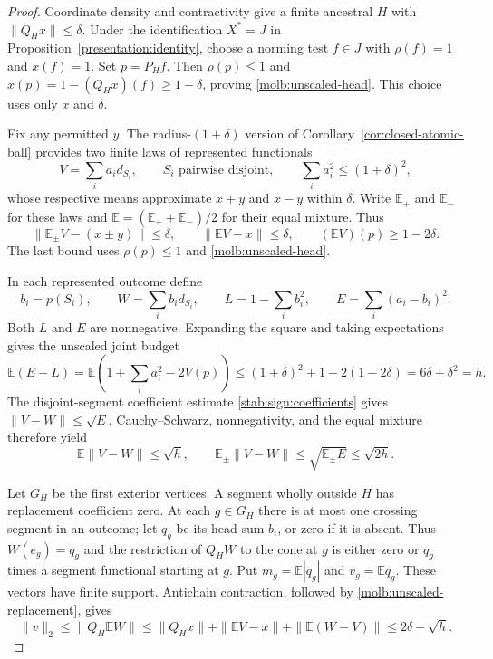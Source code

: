 \begin{proof}
Coordinate density and contractivity give a finite ancestral $H$
with $\|Q_Hx\|\le\delta$. Under the identification $X^*=J$ in
Proposition~\ref{presentation:identity}, choose a norming test
$f\in J$ with $\rho(f)=1$ and $x(f)=1$. Set $p=P_Hf$.
Then $\rho(p)\le1$ and
$x(p)=1-(Q_Hx)(f)\ge1-\delta$, proving
\eqref{molb:unscaled-head}. This choice uses only $x$ and $\delta$.

Fix any permitted $y$. The radius-$(1+\delta)$ version of
Corollary~\ref{cor:closed-atomic-ball} provides two finite laws of
represented functionals
\[
 V=\sum_i a_i d_{S_i},\qquad
 S_i\text{ pairwise disjoint},\qquad
 \sum_i a_i^2\le(1+\delta)^2,
\]
whose respective means approximate $x+y$ and $x-y$ within $\delta$.
Write $\mathbb E_+$ and $\mathbb E_-$ for these laws and
$\mathbb E=(\mathbb E_++\mathbb E_-)/2$ for their equal mixture.
Thus
\[
 \|\mathbb E_\pm V-(x\pm y)\|\le\delta,
 \qquad \|\mathbb EV-x\|\le\delta,
 \qquad (\mathbb EV)(p)\ge1-2\delta.
\]
The last bound uses $\rho(p)\le1$ and
\eqref{molb:unscaled-head}.

In each represented outcome define
\[
 b_i=p(S_i),\qquad W=\sum_i b_i d_{S_i},\qquad
 L=1-\sum_i b_i^2,\qquad E=\sum_i(a_i-b_i)^2.
\]
Both $L$ and $E$ are nonnegative. Expanding the square and taking
expectations gives the unscaled joint budget
\begin{equation}\label{molb:unscaled-budget}
 \mathbb E(E+L)
 =\mathbb E\left(1+\sum_i a_i^2-2V(p)\right)
 \le(1+\delta)^2+1-2(1-2\delta)
 =6\delta+\delta^2=h.
\end{equation}
The disjoint-segment coefficient estimate
\eqref{stab:sign:coefficients} gives $\|V-W\|\le\sqrt E$.
Cauchy--Schwarz, nonnegativity, and the equal mixture therefore yield
\begin{equation}\label{molb:unscaled-replacement}
 \mathbb E\|V-W\|\le\sqrt h,
 \qquad
 \mathbb E_\pm\|V-W\|
 \le\sqrt{\mathbb E_\pm E}\le\sqrt{2h}.
\end{equation}

Let $G_H$ be the first exterior vertices. A segment wholly outside
$H$ has replacement coefficient zero. At each $g\in G_H$ there is
at most one crossing segment in an outcome; let $q_g$ be its head
sum $b_i$, or zero if it is absent. Thus $W(e_g)=q_g$ and the
restriction of $Q_HW$ to the cone at $g$ is either zero or $q_g$
times a segment functional starting at $g$. Put
$m_g=\mathbb E|q_g|$ and $v_g=\mathbb E q_g$.
These vectors have finite support. Antichain contraction, followed
by \eqref{molb:unscaled-replacement}, gives
\begin{equation}\label{molb:unscaled-signed}
 \|v\|_2\le\|Q_H\mathbb EW\|
 \le\|Q_Hx\|+\|\mathbb EV-x\|
       +\|\mathbb E(W-V)\|
 \le2\delta+\sqrt h.
\end{equation}


\end{proof}
